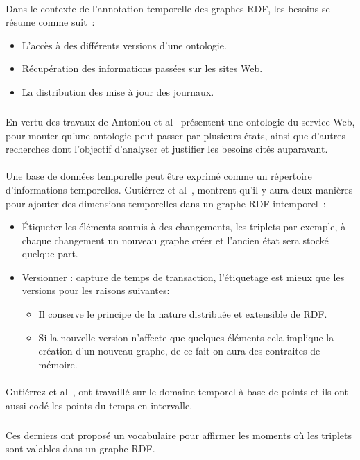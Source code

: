 \documentclass[12pt,a4	]{report}
\begin{document}
\paragraph{}
Dans le contexte de l'annotation temporelle des graphes RDF, les besoins se résume comme suit~:
\begin{itemize}
\item L'accès à des différents versions d’une ontologie.
\item Récupération des informations passées sur les sites Web.
\item La distribution des mise à jour des journaux.
\end{itemize}
\subparagraph{}
En vertu des travaux de Antoniou et al~\cite{antoniou2004} présentent une ontologie du service Web, pour monter qu'une ontologie peut passer par plusieurs états, ainsi que d'autres recherches dont l'objectif d'analyser et justifier les besoins cités auparavant.
\paragraph{}
Une base de données temporelle peut être exprimé comme un répertoire d'informations temporelles.
Gutiérrez et al~\cite{gutierrez2007}, montrent qu'il y aura deux manières pour ajouter des dimensions temporelles dans un graphe RDF intemporel~:
\begin{itemize}
\item Étiqueter les éléments soumis à des changements, les triplets par exemple, à chaque changement un nouveau graphe créer et l’ancien état sera stocké quelque part.
\item Versionner : capture de temps de transaction, l’étiquetage est mieux que les versions pour les raisons suivantes:
\begin{itemize}
\item Il conserve le principe de la nature distribuée et extensible de RDF.
\item Si la nouvelle version n’affecte que quelques éléments cela implique la création d’un nouveau graphe, de ce fait on aura des contraites de mémoire.
\end{itemize}
\end{itemize}
\paragraph{}
Gutiérrez et al~\cite{gutierrez2007}, ont travaillé sur le domaine temporel à base de points et ils ont aussi codé les points du temps en intervalle.
\subparagraph{}
Ces derniers ont proposé un vocabulaire pour affirmer les moments où les triplets sont valables dans un graphe RDF.
\end{document}
